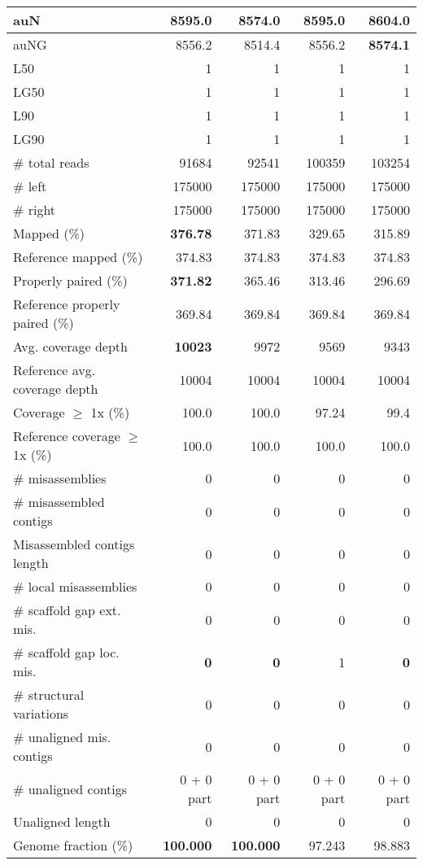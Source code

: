 \documentclass[12pt,a4paper]{article}
\begin{document}
\begin{table}[ht]
\begin{center}
\begin{tabular}{|l*{4}{|r}|}
auN & 8595.0 & 8574.0 & 8595.0 & {\bf 8604.0} \\ \hline
auNG & 8556.2 & 8514.4 & 8556.2 & {\bf 8574.1} \\ \hline
L50 & 1 & 1 & 1 & 1 \\ \hline
LG50 & 1 & 1 & 1 & 1 \\ \hline
L90 & 1 & 1 & 1 & 1 \\ \hline
LG90 & 1 & 1 & 1 & 1 \\ \hline
\# total reads & 91684 & 92541 & 100359 & 103254 \\ \hline
\# left & 175000 & 175000 & 175000 & 175000 \\ \hline
\# right & 175000 & 175000 & 175000 & 175000 \\ \hline
Mapped (\%) & {\bf 376.78} & 371.83 & 329.65 & 315.89 \\ \hline
Reference mapped (\%) & 374.83 & 374.83 & 374.83 & 374.83 \\ \hline
Properly paired (\%) & {\bf 371.82} & 365.46 & 313.46 & 296.69 \\ \hline
Reference properly paired (\%) & 369.84 & 369.84 & 369.84 & 369.84 \\ \hline
Avg. coverage depth & {\bf 10023} & 9972 & 9569 & 9343 \\ \hline
Reference avg. coverage depth & 10004 & 10004 & 10004 & 10004 \\ \hline
Coverage $\geq$ 1x (\%) & 100.0 & 100.0 & 97.24 & 99.4 \\ \hline
Reference coverage $\geq$ 1x (\%) & 100.0 & 100.0 & 100.0 & 100.0 \\ \hline
\# misassemblies & 0 & 0 & 0 & 0 \\ \hline
\# misassembled contigs & 0 & 0 & 0 & 0 \\ \hline
Misassembled contigs length & 0 & 0 & 0 & 0 \\ \hline
\# local misassemblies & 0 & 0 & 0 & 0 \\ \hline
\# scaffold gap ext. mis. & 0 & 0 & 0 & 0 \\ \hline
\# scaffold gap loc. mis. & {\bf 0} & {\bf 0} & 1 & {\bf 0} \\ \hline
\# structural variations & 0 & 0 & 0 & 0 \\ \hline
\# unaligned mis. contigs & 0 & 0 & 0 & 0 \\ \hline
\# unaligned contigs & 0 + 0 part & 0 + 0 part & 0 + 0 part & 0 + 0 part \\ \hline
Unaligned length & 0 & 0 & 0 & 0 \\ \hline
Genome fraction (\%) & {\bf 100.000} & {\bf 100.000} & 97.243 & 98.883 \\ \hline

\end{tabular}
\end{center}
\end{table}
\end{document}
